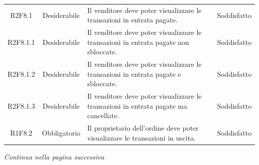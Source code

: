\begin{table}[H]
\begin{tabular}{c | c | p{6cm} | c}
        R2F8.1                                                            & Desiderabile & Il venditore deve poter visualizzare le transazioni in entrata pagate.                                                & Soddisfatto \\
        R2F8.1.1                                                          & Desiderabile & Il venditore deve poter visualizzare le transazioni in entrata pagate non sbloccate.                                  & Soddisfatto                              \\
        R2F8.1.2                                                          & Desiderabile & Il venditore deve poter visualizzare le transazioni in entrata pagate e sbloccate.                                    & Soddisfatto                               \\
        R2F8.1.3                                                          & Desiderabile & Il venditore deve poter visualizzare le transazioni in entrata pagate ma cancellate.                                  & Soddisfatto                               \\
        R1F8.2                                                            & Obbligatorio & Il proprietario dell'ordine deve poter visualizzare le transazioni in uscita.                                         & Soddisfatto                                 \\
    \end{tabular}
\end{table}
\begin{center}
    \textit{\small Continua nella pagina successiva}
\end{center}
